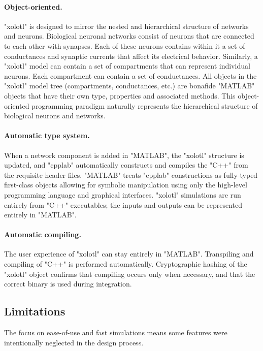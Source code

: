 \documentclass{frontiersSCNS} %
\begin{document}
\paragraph{Object-oriented.}
"xolotl" is designed to mirror the nested and hierarchical structure of networks and neurons.  Biological neuronal networks consist of neurons that are connected to each other with synapses. Each of these neurons contains within it a set of conductances and synaptic currents that affect its electrical behavior. Similarly, a "xolotl" model can contain a set of compartments that can represent individual neurons. Each compartment can contain a set of conductances. All objects in the "xolotl" model tree (compartments, conductances, etc.) are bonafide "MATLAB" objects that have their own type, properties and associated methods. This object-oriented programming paradigm naturally represents the hierarchical structure of biological neurons and networks. 

\paragraph{Automatic type system.}
When a network component is added in "MATLAB", the "xolotl" structure is updated, and "cpplab" automatically constructs and compiles the "C++" from the requisite header files. "MATLAB" treats "cpplab" constructions as fully-typed first-class objects allowing for symbolic manipulation using only the high-level programming language and graphical interfaces. "xolotl" simulations are run entirely from "C++" executables; the inputs and outputs can be represented entirely in "MATLAB".

\paragraph{Automatic compiling.}
The user experience of "xolotl" can stay entirely in "MATLAB". Transpiling and compiling of "C++" is performed automatically. Cryptographic hashing of the "xolotl" object confirms that compiling occurs only when necessary, and that the correct binary is used during integration.

\subsection{Limitations}
\label{limitations}

The focus on ease-of-use and fast simulations means some features were intentionally neglected in the design process. 
\end{document}
